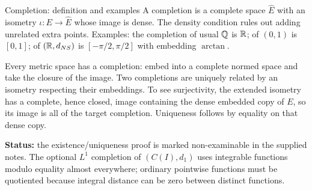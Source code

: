 \begin{note}{Completion: definition and examples}
A completion is a complete space $\widehat E$ with an isometry $\iota:E\to\widehat E$ whose image is dense. The density condition rules out adding unrelated extra points. Examples: the completion of usual $\mathbb Q$ is $\mathbb R$; of $(0,1)$ is $[0,1]$; of $(\mathbb R,d_{NS})$ is $[-\pi/2,\pi/2]$ with embedding $\arctan$.

Every metric space has a completion: embed into a complete normed space and take the closure of the image. Two completions are uniquely related by an isometry respecting their embeddings. To see surjectivity, the extended isometry has a complete, hence closed, image containing the dense embedded copy of $E$, so its image is all of the target completion. Uniqueness follows by equality on that dense copy.

\textbf{Status:} the existence/uniqueness proof is marked non-examinable in the supplied notes. The optional $L^1$ completion of $(C(I),d_1)$ uses integrable functions modulo equality almost everywhere; ordinary pointwise functions must be quotiented because integral distance can be zero between distinct functions.
\end{note}


